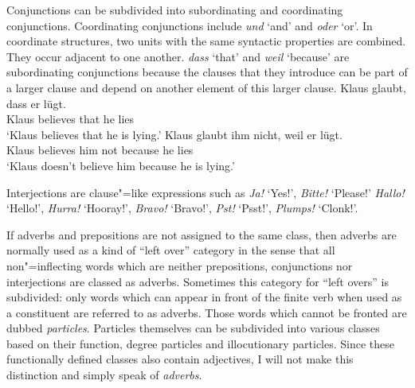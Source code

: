 Conjunctions can be subdivided into subordinating and coordinating conjunctions. Coordinating conjunctions include
\emph{und} `and' and \emph{oder} `or'. In coordinate structures, two units with the same syntactic properties are
combined. They occur adjacent to one another. \emph{dass} `that' and \emph{weil} `because' are subordinating conjunctions because
the clauses that they introduce can be part of a larger clause and depend on another element of this
larger clause.
\eal
\ex 
\gll Klaus glaubt, dass er lügt.\\
	 Klaus believes that he lies\\
\glt `Klaus believes that he is lying.'
\ex 
\gll Klaus glaubt ihm nicht, weil er lügt.\\
	 Klaus believes him not because he lies\\
\glt `Klaus doesn't believe him because he is lying.'
\zl

Interjections are clause"=like expressions such as \emph{Ja!} `Yes!', \emph{Bitte!} `Please!' %
\emph{Hallo!} `Hel\-lo!', 
 \emph{Hurra!} `Hooray!', \emph{Bravo!} `Bravo!', \emph{Pst!} `Psst!', \emph{Plumps!} `Clonk!'.
 
If adverbs and prepositions are not assigned to the same class, then adverbs are normally used as a kind of ``left over''
category in the sense that all non"=inflecting words which are neither prepositions, conjunctions nor interjections are classed as adverbs. Sometimes
this category for ``left overs'' is subdivided: only words which can appear in front of the finite verb when used as a constituent are 
referred to as adverbs. Those words which cannot be fronted are dubbed \emph{particles}. Particles themselves can be subdivided
into various classes based on their function, \eg degree particles and illocutionary
particles. Since these functionally defined classes also contain adjectives, I will not make this distinction and simply speak of \emph{adverbs}.



